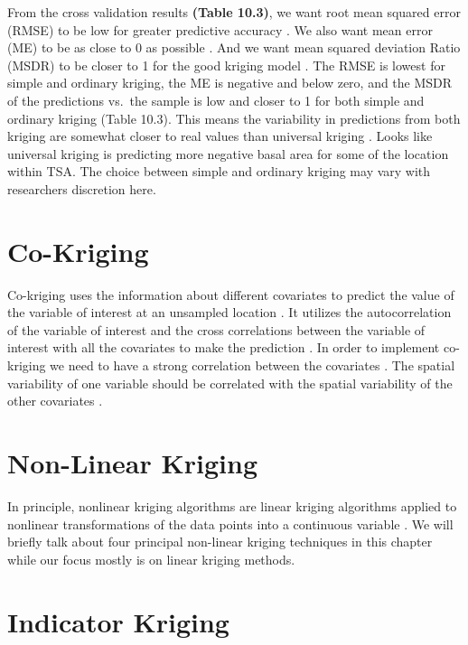\documentclass[
]{book}
\begin{document}
From the cross validation results \textbf{(Table 10.3)}, we want root mean squared error (RMSE) to be low for greater predictive accuracy \citep{Tziachris2017}. We also want mean error (ME) to be as close to 0 as possible \citep{Tziachris2017}. And we want mean squared deviation Ratio (MSDR) to be closer to 1 for the good kriging model \citep{Tziachris2017}. The RMSE is lowest for simple and ordinary kriging, the ME is negative and below zero, and the MSDR of the predictions vs.~the sample is low and closer to 1 for both simple and ordinary kriging (Table 10.3). This means the variability in predictions from both kriging are somewhat closer to real values than universal kriging \citep{Tziachris2017}. Looks like universal kriging is predicting more negative basal area for some of the location within TSA. The choice between simple and ordinary kriging may vary with researchers discretion here.

\hypertarget{co-kriging}{%
\section{Co-Kriging}\label{co-kriging}}

Co-kriging uses the information about different covariates to predict the value of the variable of interest at an unsampled location \citep{Cressie1994}. It utilizes the autocorrelation of the variable of interest and the cross correlations between the variable of interest with all the covariates to make the prediction \citep{Cressie1994}. In order to implement co-kriging we need to have a strong correlation between the covariates \citep{Tziachris2017}. The spatial variability of one variable should be correlated with the spatial variability of the other covariates \citep{Tziachris2017}.

\hypertarget{non-linear-kriging}{%
\section{Non-Linear Kriging}\label{non-linear-kriging}}

In principle, nonlinear kriging algorithms are linear kriging algorithms applied to nonlinear transformations of the data points into a continuous variable \citep{Deutsch1993GSLIBGS}. We will briefly talk about four principal non-linear kriging techniques in this chapter while our focus mostly is on linear kriging methods.

\hypertarget{indicator-kriging}{%
\section{Indicator Kriging}\label{indicator-kriging}}
\end{document}

